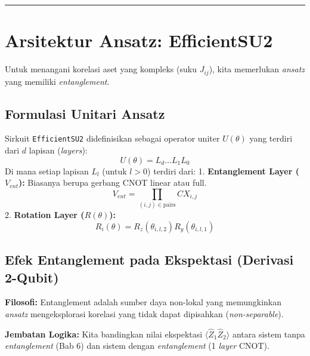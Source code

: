 \documentclass[12pt,a4paper]{article}
\begin{document}
\begin{center}\rule{0.5\linewidth}{0.5pt}\end{center}

\hypertarget{arsitektur-ansatz-efficientsu2}{%
\section{Arsitektur Ansatz: EfficientSU2}\label{arsitektur-ansatz-efficientsu2}}

Untuk menangani korelasi aset yang kompleks (suku \(J_{ij}\)), kita memerlukan \emph{ansatz} yang memiliki \emph{entanglement}.

\hypertarget{a.-formulasi-unitari-ansatz}{%
\subsection{Formulasi Unitari Ansatz}\label{a.-formulasi-unitari-ansatz}}

Sirkuit \texttt{EfficientSU2} didefinisikan sebagai operator uniter \(U(\theta)\) yang terdiri dari \(d\) lapisan (\emph{layers}): \[ U(\theta) = L_d \dots L_1 L_0 \] Di mana setiap lapisan \(L_l\) (untuk \(l > 0\)) terdiri dari: 1. \textbf{Entanglement Layer (\(V_{ent}\)):} Biasanya berupa gerbang CNOT linear atau full. \[ V_{ent} = \prod_{(i,j) \in \text{pairs}} CX_{i,j} \] 2. \textbf{Rotation Layer (\(R(\theta)\)):} \[ R_i(\theta) = R_z(\theta_{i,l,2}) R_y(\theta_{i,l,1}) \]

\hypertarget{b.-efek-entanglement-pada-ekspektasi-derivasi-2-qubit}{%
\subsection{Efek Entanglement pada Ekspektasi (Derivasi 2-Qubit)}\label{b.-efek-entanglement-pada-ekspektasi-derivasi-2-qubit}}

\textbf{Filosofi:} Entanglement adalah sumber daya non-lokal yang memungkinkan \emph{ansatz} mengeksplorasi korelasi yang tidak dapat dipisahkan (\emph{non-separable}).

\textbf{Jembatan Logika:} Kita bandingkan nilai ekspektasi \(\langle \hat{Z}_1 \hat{Z}_2 \rangle\) antara sistem tanpa \emph{entanglement} (Bab 6) dan sistem dengan \emph{entanglement} (1 \emph{layer} CNOT).
\end{document}
